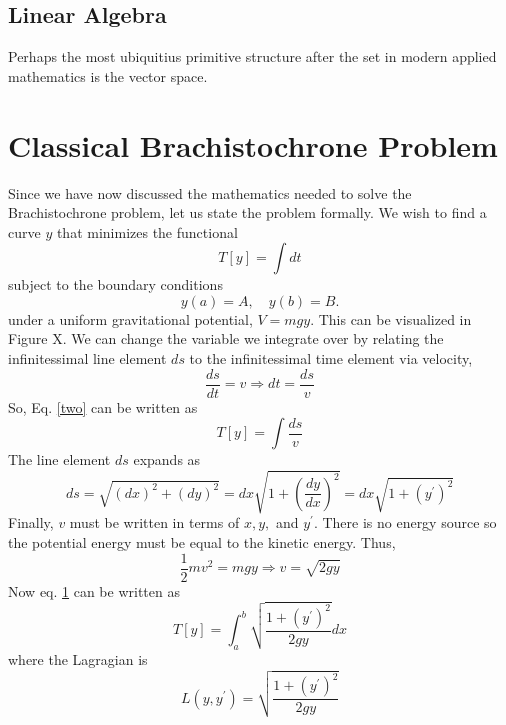 \documentclass[11pt]{article}
\begin{document}
\subsection{Linear Algebra}
Perhaps the most ubiquitius primitive structure after the set in modern applied mathematics is the vector space.

\section{Classical Brachistochrone Problem}
Since we have now discussed the mathematics needed to solve the Brachistochrone problem, let us state the problem formally. We wish to find a curve $y$ that minimizes the functional
\begin{equation}
    T[y] = \int dt
\end{equation}
subject to the boundary conditions
$$y(a) = A, \quad y(b) = B.$$
under a uniform gravitational potential, $V = mgy$. This can be visualized in Figure X. We can change the variable we integrate over by relating the infinitessimal line element $ds$ to the infinitessimal time element via velocity,
\begin{equation*}
    \frac{ds}{dt} = v \Rightarrow dt = \frac{ds}{v}
\end{equation*}
So, Eq. \ref{two} can be written as
\begin{equation}
    T[y] = \int \frac{ds}{v}
\end{equation}
The line element $ds$ expands as
\begin{equation*}
    ds = \sqrt{(dx)^2 + (dy)^2} = dx \sqrt{1 + \left ( \frac{dy}{dx} \right )^2} = dx \sqrt{1 + (y^{\prime})^2}
\end{equation*}
Finally, $v$ must be written in terms of $x, y,$ and $y^\prime$. There is no energy source so the potential energy must be equal to the kinetic energy. Thus,
\begin{equation*}
    \frac{1}{2} m v^2 = mgy \Rightarrow v = \sqrt{2gy}
\end{equation*}
Now eq. \ref{} can be written as
\begin{equation}
    T[y] = \int_{a}^{b} \sqrt{\frac{1 + (y^{\prime})^2}{2gy}} dx
\end{equation}
where the Lagragian is
\begin{equation}
    L(y, y^\prime) = \sqrt{\frac{1 + (y^{\prime})^2}{2gy}}
\end{equation}
\end{document}
